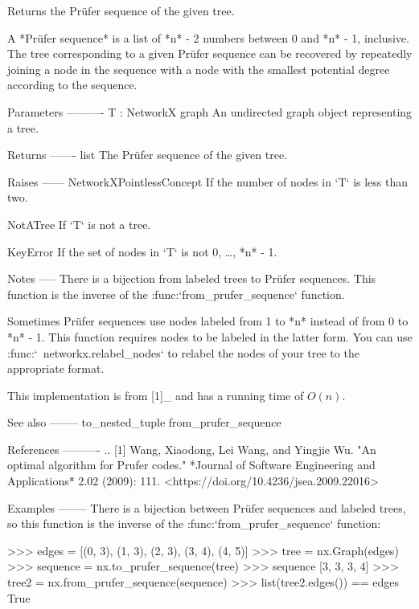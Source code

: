 \begin{DoxyVerb}Returns the Prüfer sequence of the given tree.

A *Prüfer sequence* is a list of *n* - 2 numbers between 0 and
*n* - 1, inclusive. The tree corresponding to a given Prüfer
sequence can be recovered by repeatedly joining a node in the
sequence with a node with the smallest potential degree according to
the sequence.

Parameters
----------
T : NetworkX graph
    An undirected graph object representing a tree.

Returns
-------
list
    The Prüfer sequence of the given tree.

Raises
------
NetworkXPointlessConcept
    If the number of nodes in `T` is less than two.

NotATree
    If `T` is not a tree.

KeyError
    If the set of nodes in `T` is not {0, …, *n* - 1}.

Notes
-----
There is a bijection from labeled trees to Prüfer sequences. This
function is the inverse of the :func:`from_prufer_sequence`
function.

Sometimes Prüfer sequences use nodes labeled from 1 to *n* instead
of from 0 to *n* - 1. This function requires nodes to be labeled in
the latter form. You can use :func:`~networkx.relabel_nodes` to
relabel the nodes of your tree to the appropriate format.

This implementation is from [1]_ and has a running time of
$O(n)$.

See also
--------
to_nested_tuple
from_prufer_sequence

References
----------
.. [1] Wang, Xiaodong, Lei Wang, and Yingjie Wu.
       "An optimal algorithm for Prufer codes."
       *Journal of Software Engineering and Applications* 2.02 (2009): 111.
       <https://doi.org/10.4236/jsea.2009.22016>

Examples
--------
There is a bijection between Prüfer sequences and labeled trees, so
this function is the inverse of the :func:`from_prufer_sequence`
function:

>>> edges = [(0, 3), (1, 3), (2, 3), (3, 4), (4, 5)]
>>> tree = nx.Graph(edges)
>>> sequence = nx.to_prufer_sequence(tree)
>>> sequence
[3, 3, 3, 4]
>>> tree2 = nx.from_prufer_sequence(sequence)
>>> list(tree2.edges()) == edges
True\end{DoxyVerb}
 